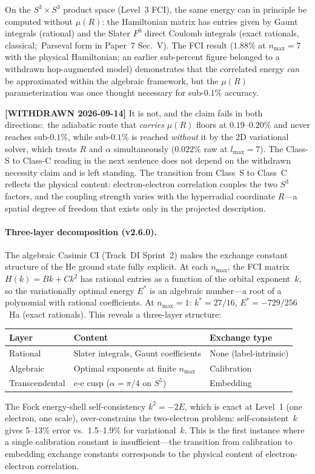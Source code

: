 \documentclass[aps,pra,twocolumn,superscriptaddress,longbibliography]{revtex4-2}
\newcommand{\gvq}[2]{#2}%
\begin{document}
On the $S^3 \times S^3$ product space (Level~3 FCI), the same
energy can in principle be computed without $\mu(R)$: the
Hamiltonian matrix has entries given by Gaunt integrals (rational)
and the Slater $F^0$ direct Coulomb integrals (exact rationals,
classical;\ Parseval form in Paper~7 Sec.~V).  The FCI result ($\gvq{he_gn_phys_n7_pct}{1.88}\%$ at
$n_{\max}=7$ with the physical Hamiltonian; an earlier sub-percent
figure belonged to a withdrawn hop-augmented model) demonstrates that
the correlated energy \emph{can} be approximated within the
algebraic framework, but the $\mu(R)$ parameterization was once
thought necessary for sub-$0.1\%$ accuracy.

\textbf{[WITHDRAWN 2026-09-14]} It is not, and the claim fails in both
directions:\ the adiabatic route that \emph{carries} $\mu(R)$ floors at
$0.19$--$0.20\%$ and never reaches sub-$0.1\%$, while sub-$0.1\%$ is
reached \emph{without} it by the 2D variational solver, which treats $R$
and $\alpha$ simultaneously ($0.022\%$ raw at $l_{\max} = 7$).  The
Class-S to Class-C reading in the next sentence does not depend on the
withdrawn necessity claim and is left standing.  The transition from Class~S to
Class~C reflects the physical content: electron-electron
correlation couples the two $S^3$ factors, and the coupling
strength varies with the hyperradial coordinate $R$---a spatial
degree of freedom that exists only in the projected description.

\paragraph{Three-layer decomposition (v2.6.0).}
The algebraic Casimir CI (Track~DI Sprint~2) makes the exchange
constant structure of the He ground state fully explicit.  At each
$n_{\max}$, the FCI matrix $H(k) = Bk + Ck^2$ has rational entries
as a function of the orbital exponent~$k$, so the variationally
optimal energy $E^*$ is an algebraic number---a root of a polynomial
with rational coefficients.  At $n_{\max} = 1$: $k^* = 27/16$,
$E^* = -729/256$~Ha (exact rationals).  This reveals a three-layer
structure:
\begin{center}
\begin{tabular}{lll}
\hline
Layer & Content & Exchange type \\
\hline
Rational & Slater integrals, Gaunt coefficients & None (label-intrinsic) \\
Algebraic & Optimal exponents at finite $n_{\max}$ & Calibration \\
Transcendental & e-e cusp ($\alpha = \pi/4$ on $S^5$) & Embedding \\
\hline
\end{tabular}
\end{center}
The Fock energy-shell self-consistency $k^2 = -2E$, which is exact
at Level~1 (one electron, one scale), over-constrains the
two-electron problem: self-consistent~$k$ gives 5--13\% error vs.\
1.5--1.9\% for variational~$k$.  This is the first instance where a
single calibration constant is insufficient---the transition from
calibration to embedding exchange constants corresponds to the
physical content of electron-electron correlation.
\end{document}
